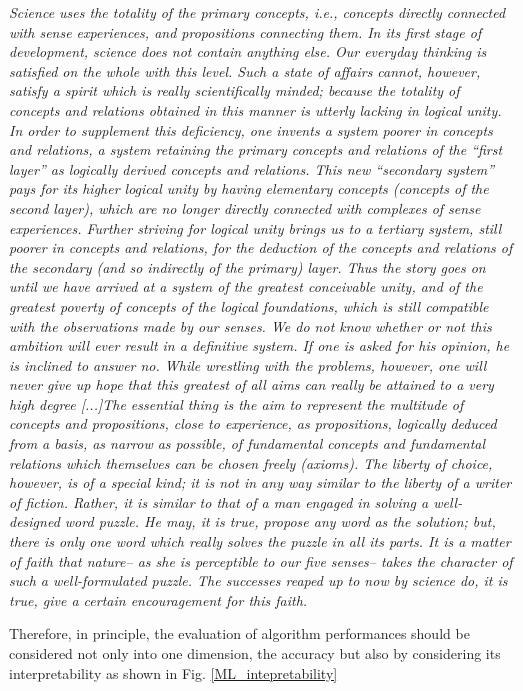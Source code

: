 \documentclass[12pt,%
               a4paper,%
               oneside,openany,%
               titlepage,%
               headinclude,footinclude,%
               BCOR5mm,%
               cleardoublepage=empty,%
               tablecaptionabove,%
               floatperchapter,
               ]{scrreprt}                 %
\begin{document}
\begin{displayquote}
\textit{Science uses the totality of the primary concepts, i.e., concepts directly connected with sense experiences, and propositions connecting them. In its first stage of development, science does not contain anything else. Our everyday thinking is satisfied on the whole with this level. Such a state of affairs cannot, however, satisfy a spirit which is really scientifically minded; because the totality of concepts and relations obtained in this manner is utterly lacking in logical unity. In order to supplement this deficiency, one invents a system poorer in concepts and relations, a system retaining the primary concepts and relations of the “first layer” as logically derived concepts and relations. This new “secondary system” pays for its higher logical unity by having elementary concepts (concepts of the second layer), which are no longer directly connected with complexes of sense experiences. Further striving for logical unity brings us to a tertiary system, still poorer in concepts and relations, for the deduction of the concepts and relations of the secondary (and so indirectly of the primary) layer. Thus the story goes on until we have arrived at a system of the greatest conceivable unity, and of the greatest poverty of concepts of the logical foundations, which is still compatible with the observations made by our senses. We do not know whether or not this ambition will ever result in a definitive system. If one is asked for his opinion, he is inclined to answer no. While wrestling with the problems, however, one will never give up hope that this greatest of all aims can really be attained to a very high degree [...]The essential thing is the aim to represent the multitude of concepts and propositions, close to experience, as propositions, logically deduced from a basis, as narrow as possible, of fundamental concepts and fundamental relations which themselves can be chosen freely (axioms). The liberty of choice, however, is of a special kind; it is not in any way similar to the liberty of a writer of fiction. Rather, it is similar to that of a man engaged in solving a well-designed word puzzle. He may, it is true, propose any word as the solution; but, there is only one word which really solves the puzzle in all its parts. It is a matter of faith that nature– as she is perceptible to our five senses– takes the character of such a well-formulated puzzle. The successes reaped up to now by science do, it is true, give a certain encouragement for this faith.}
\end{displayquote}
Therefore, in principle, the evaluation of algorithm performances should be considered not only into one dimension, the accuracy but also by considering its interpretability as shown in Fig. \ref{ML_intepretability}
\end{document}
